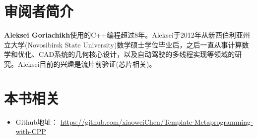 \section*{审阅者简介}

\textbf{Aleksei Goriachikh}使用的C++编程超过8年。Aleksei于2012年从新西伯利亚州立大学(Novosibirsk State University)数学硕士学位毕业后，之后一直从事计算数学和优化、CAD系统的几何核心设计，以及自动驾驶的多线程实现等领域的研究。Aleksei目前的兴趣是流片前验证(芯片相关)。

\section*{本书相关}
\begin{itemize}
  \item Github地址： \url{https://github.com/xiaoweiChen/Template-Metaprogramming-with-CPP}
\end{itemize}